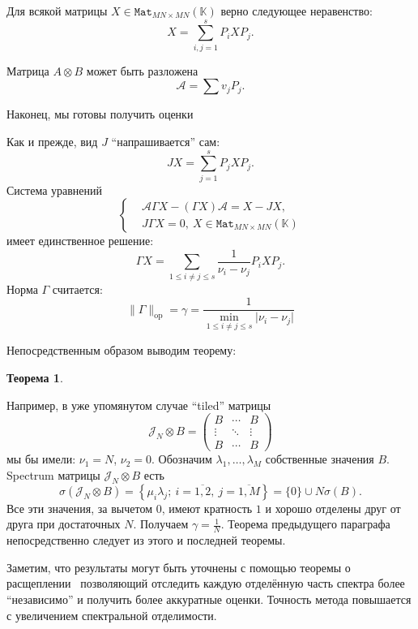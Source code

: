 \documentclass[14pt,a4paper]{extarticle}
\newtheorem{thm}{Теорема}
\theoremstyle{definition}
\begin{document}
Для всякой матрицы \( X\in \mathtt{Mat}_{MN{\times}MN}(\mathbb{K}) \)
верно следующее неравенство:
    \[
        X = \sum_{i,j=1}^s P_i X P_j.
    \]

Матрица \( A\otimes B \) может быть разложена
    \[
        \mathcal{A} = \sum v_j P_j.
    \]

Наконец, мы готовы получить оценки

Как и прежде, вид \( J \) ``напрашивается'' сам:
    \[
        JX = \sum_{j=1}^s P_j X P_j.
    \]
Система уравнений
    \[\left\{\begin{aligned}
        & \mathcal{A}\Gamma X - (\Gamma X) \mathcal{A} = X - JX, \\
        & J\Gamma X = 0,\ X\in \mathtt{Mat}_{MN{\times}MN}(\mathbb{K})
    \end{aligned}\right.\]
имеет единственное решение:
    \[
        \Gamma X = \sum_{1\leq i{\neq}j \leq s} \frac{1}{\nu_i-\nu_j} P_i X P_j.
    \]
Норма \( \Gamma \) считается:
    \[
        \|\Gamma\|_{\mathrm{op}} = \gamma = \frac{1}{\min_{1\leq i{\neq}j\leq s}\lvert\nu_i - \nu_j\rvert}
    \]

Непосредственным образом выводим теорему:

\begin{thm}\label{nk:thm:kron}
  
\end{thm}

Например, в уже упомянутом случае ``tiled'' матрицы
\[
    \mathcal{J}_N{\otimes}B =
    \begin{pmatrix}
        B & \cdots & B \\
        \vdots & \ddots & \vdots \\
        B & \cdots & B
    \end{pmatrix}
\]
мы бы имели:
    \( \nu_1=N \),
    \( \nu_2=0 \).
Обозначим \( \lambda_1,\ldots,\lambda_M \)
    собственные значения \( B \).
Spectrum матрицы \( \mathcal{J}_N{\otimes}B \) есть
    \[
        \sigma(\mathcal{J}_N{\otimes}B) = \left\{ \mu_i\lambda_j;\ i{=}\overline{1,2},\ j{=}\overline{1,M}\right\} = \{0\}\cup N\sigma(B).
    \]
Все эти значения, за вычетом \( 0 \),
    имеют кратность \( 1 \)
    и хорошо отделены друг от друга при достаточных \( N \).
Получаем \( \gamma=\frac1N \).
Теорема предыдущего параграфа непосредственно следует из этого и последней теоремы.

Заметим, что результаты могут быть уточнены с помощью теоремы о расщеплении~\cite{baskakov1987theorem}
позволяющий отследить каждую отделённую часть спектра более ``независимо''
и получить более аккуратные оценки.
Точность метода повышается с увеличением спектральной отделимости.
\end{document}
